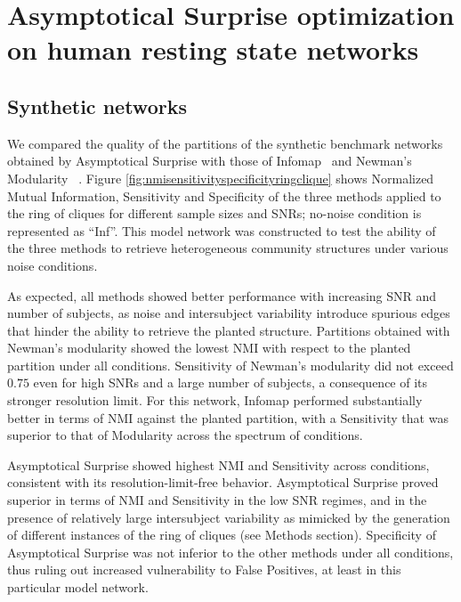 \section{Asymptotical Surprise optimization on human resting state networks}
\subsection{Synthetic networks}
We compared the quality of the partitions of the synthetic benchmark networks obtained by Asymptotical Surprise with those of Infomap~\cite{rosvall2008} and Newman's Modularity ~\cite{newman2006,blondel2008}. Figure \ref{fig:nmisensitivityspecificityringclique} shows Normalized Mutual Information, Sensitivity and Specificity of the three methods applied to the ring of cliques for different sample sizes and SNRs; no-noise condition is represented as ``Inf''.
This model network was constructed to test the ability of the three methods to retrieve heterogeneous community structures under various noise conditions.

As expected, all methods showed better performance with increasing SNR and number of subjects, as noise and intersubject variability introduce spurious edges that hinder the ability to retrieve the planted structure.
Partitions obtained with Newman's modularity showed the lowest NMI with respect to the planted partition under all conditions.
Sensitivity of Newman's modularity did not exceed $0.75$ even for high SNRs and a large number of subjects, a consequence of its stronger resolution limit.
For this network, Infomap performed substantially better in terms of NMI against the planted partition, with a Sensitivity that was superior to that of Modularity across the spectrum of conditions.

Asymptotical Surprise showed highest NMI and Sensitivity across conditions, consistent with its resolution-limit-free behavior. Asymptotical Surprise proved superior in terms of NMI and Sensitivity in the low SNR regimes, and in the presence of relatively large intersubject variability as mimicked by the generation of different instances of the ring of cliques (see Methods section). Specificity of Asymptotical Surprise was not inferior to the other methods under all conditions, thus ruling out increased vulnerability to False Positives, at least in this particular model network.

